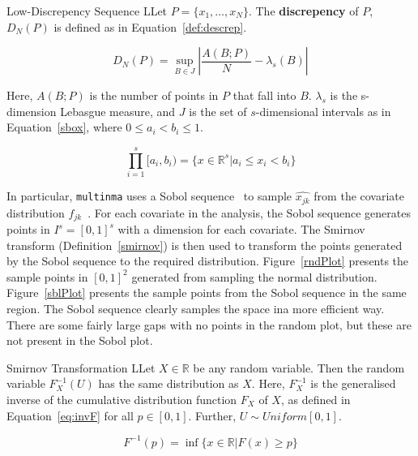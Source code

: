 \begin{definition}[label=discrepency]{Low-Discrepency Sequence}
    LLet $P = \{x_1, \ldots, x_N\}$. The \textbf{discrepency} of $P$, $D_N(P)$ is defined as in Equation~\ref{def:descrep}.

    \begin{equation}
        D_N(P) = \sup_{B \in J}\left|\frac{A(B;P)}{N} - \lambda_s(B)\right|
        \label{def:descrep}
    \end{equation}

    Here, $A(B;P)$ is the number of points in $P$ that fall into $B$. $\lambda_s$ is the s-dimension Lebasgue measure, and $J$ is the set of $s$-dimensional intervals as in Equation~\ref{sbox}, where $0 \leq a_i < b_i \leq 1$.
    
    \begin{equation}
        \prod_{i = 1}^{s} [a_i,b_i) = \{x \in \mathbb{R}^s | a_i \leq x_i < b_i \}
        \label{sbox}
    \end{equation}
\end{definition}

In particular, \verb|multinma| uses a Sobol sequence~\cite{sobol} to sample $\hat{x_{jk}}$ from the covariate distribution $f_{jk}$~\cite{phillippo2020}. For each covariate in the analysis, the Sobol sequence generates points in $I^s = [0,1]^s$ with a dimension for each covariate. The Smirnov transform (Definition~\ref{smirnov}) is then used to transform the points generated by the Sobol sequence to the required distribution. Figure~\ref{rndPlot} presents the sample points in $[0,1]^2$ generated from sampling the normal distribution. Figure~\ref{sblPlot} presents the sample points from the Sobol sequence in the same region. The Sobol sequence clearly samples the space ina more efficient way. There are some fairly large gaps with no points in the random plot, but these are not present in the Sobol plot.  

\begin{definition}[label=smirnov]{Smirnov Transformation}
    LLet $X \in \mathbb{R}$ be any random variable. Then the random variable $F_X^{-1}(U)$ has the same distribution as $X$. Here, $F_X^{-1}$ is the generalised inverse of the cumulative distribution function $F_X$ of $X$, as defined in Equation~\ref{eq:invF} for all $p \in [0,1]$. Further, $U \sim Uniform[0,1]$.

    \begin{equation}
        F^{-1}(p) = \inf \{x \in \mathbb{R} | F(x) \geq p \}
        \label{eq:invF}
    \end{equation}
\end{definition}

